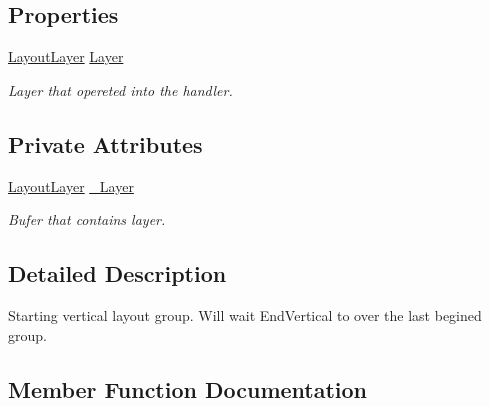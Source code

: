 \subsection*{Properties}
\begin{DoxyCompactItemize}
\item 
\mbox{\hyperlink{class_wpf_handler_1_1_u_i_1_1_auto_layout_1_1_layout_layer}{Layout\+Layer}} \mbox{\hyperlink{class_wpf_handler_1_1_u_i_1_1_auto_layout_1_1_configuration_1_1_begin_vertical_group_attribute_aba42e4648d684e4a0091d4157e58c19d}{Layer}}
\begin{DoxyCompactList}\small\item\em Layer that opereted into the handler. \end{DoxyCompactList}\end{DoxyCompactItemize}
\subsection*{Private Attributes}
\begin{DoxyCompactItemize}
\item 
\mbox{\hyperlink{class_wpf_handler_1_1_u_i_1_1_auto_layout_1_1_layout_layer}{Layout\+Layer}} \mbox{\hyperlink{class_wpf_handler_1_1_u_i_1_1_auto_layout_1_1_configuration_1_1_begin_vertical_group_attribute_ac18db79463ee3229241875a881b71c48}{\+\_\+\+Layer}}
\begin{DoxyCompactList}\small\item\em Bufer that contains layer. \end{DoxyCompactList}\end{DoxyCompactItemize}


\subsection{Detailed Description}
Starting vertical layout group. Will wait End\+Vertical to over the last begined group. 



\subsection{Member Function Documentation}
\mbox{\label{class_wpf_handler_1_1_u_i_1_1_auto_layout_1_1_configuration_1_1_begin_vertical_group_attribute_a52859bc4d83f107cbae35d20ae97ce83}} 
